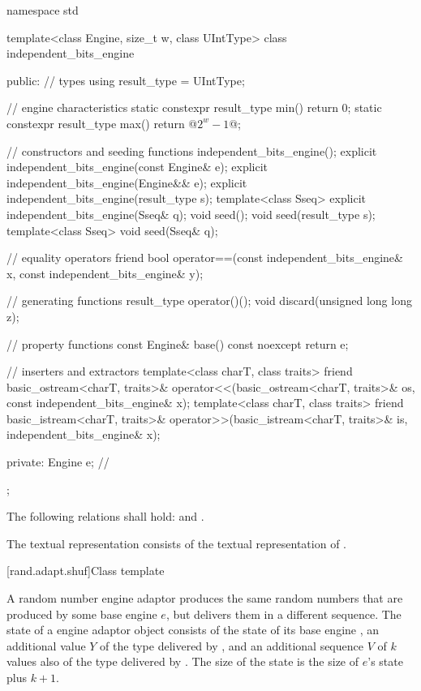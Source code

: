 %
%
\begin{codeblock}
namespace std {
  template<class Engine, size_t w, class UIntType>
  class independent_bits_engine {
  public:
    // types
    using result_type = UIntType;

    // engine characteristics
    static constexpr result_type min() { return 0; }
    static constexpr result_type max() { return @$2^w - 1$@; }

    // constructors and seeding functions
    independent_bits_engine();
    explicit independent_bits_engine(const Engine& e);
    explicit independent_bits_engine(Engine&& e);
    explicit independent_bits_engine(result_type s);
    template<class Sseq> explicit independent_bits_engine(Sseq& q);
    void seed();
    void seed(result_type s);
    template<class Sseq> void seed(Sseq& q);

    // equality operators
    friend bool operator==(const independent_bits_engine& x, const independent_bits_engine& y);

    // generating functions
    result_type operator()();
    void discard(unsigned long long z);

    // property functions
    const Engine& base() const noexcept { return e; }

    // inserters and extractors
    template<class charT, class traits>
      friend basic_ostream<charT, traits>&
        operator<<(basic_ostream<charT, traits>& os, const independent_bits_engine& x);
    template<class charT, class traits>
      friend basic_istream<charT, traits>&
        operator>>(basic_istream<charT, traits>& is, independent_bits_engine& x);

  private:
    Engine e;   // \expos
  };
}
\end{codeblock}%

\pnum
The following relations shall hold:
and
  .

\pnum
The textual representation
consists of the textual representation of .



[rand.adapt.shuf]{Class template }%
%

\pnum
A  random number engine adaptor
produces the same random numbers
that are produced by some base engine $e$,
but delivers them in a different sequence.
The state 
of a  engine adaptor object 
consists of
 the state  of its base engine ,
 an additional value $Y$ of the type delivered by ,
and
 an additional sequence $V$ of $k$ values
 also of the type delivered by .
The size of the state is
 the size of $e$'s state plus $k + 1$.

